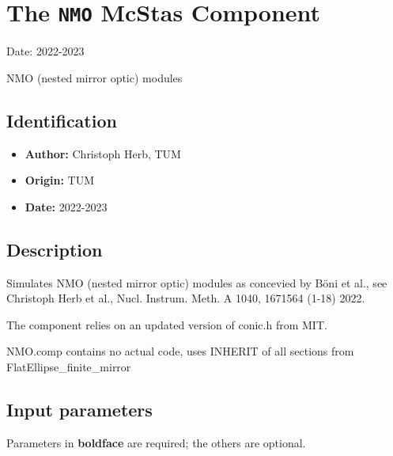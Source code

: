 \section{The \texttt{NMO} McStas Component}
Date: 2022-2023

NMO (nested mirror optic) modules

\subsection*{Identification}
\begin{itemize}
  \item \textbf{Author:} Christoph Herb, TUM
  \item \textbf{Origin:} TUM
  \item \textbf{Date:} 2022-2023
\end{itemize}

\subsection*{Description}
Simulates NMO (nested mirror optic) modules as concevied by Böni et al., see Christoph Herb et al., Nucl. Instrum. Meth. A 1040, 1671564 (1-18) 2022.

The component relies on an updated version of conic.h from MIT.

NMO.comp contains no actual code, uses INHERIT of all sections from FlatEllipse\_finite\_mirror

\subsection*{Input parameters}
Parameters in \textbf{boldface} are required; the others are optional.

